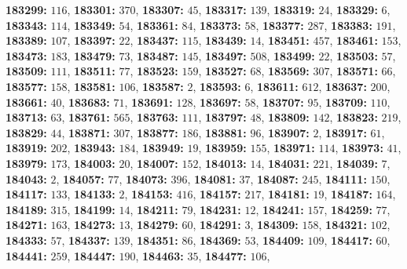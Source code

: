 \textsf{\bfseries 183299:} $116$, \textsf{\bfseries 183301:} $370$, \textsf{\bfseries 183307:} $45$, \textsf{\bfseries 183317:} $139$, \textsf{\bfseries 183319:} $24$, \textsf{\bfseries 183329:} $6$, \textsf{\bfseries 183343:} $114$, \textsf{\bfseries 183349:} $54$, \textsf{\bfseries 183361:} $84$, \textsf{\bfseries 183373:} $58$, \textsf{\bfseries 183377:} $287$, \textsf{\bfseries 183383:} $191$, \textsf{\bfseries 183389:} $107$, \textsf{\bfseries 183397:} $22$, \textsf{\bfseries 183437:} $115$, \textsf{\bfseries 183439:} $14$, \textsf{\bfseries 183451:} $457$, \textsf{\bfseries 183461:} $153$, \textsf{\bfseries 183473:} $183$, \textsf{\bfseries 183479:} $73$, \textsf{\bfseries 183487:} $145$, \textsf{\bfseries 183497:} $508$, \textsf{\bfseries 183499:} $22$, \textsf{\bfseries 183503:} $57$, \textsf{\bfseries 183509:} $111$, \textsf{\bfseries 183511:} $77$, \textsf{\bfseries 183523:} $159$, \textsf{\bfseries 183527:} $68$, \textsf{\bfseries 183569:} $307$, \textsf{\bfseries 183571:} $66$, \textsf{\bfseries 183577:} $158$, \textsf{\bfseries 183581:} $106$, \textsf{\bfseries 183587:} $2$, \textsf{\bfseries 183593:} $6$, \textsf{\bfseries 183611:} $612$, \textsf{\bfseries 183637:} $200$, \textsf{\bfseries 183661:} $40$, \textsf{\bfseries 183683:} $71$, \textsf{\bfseries 183691:} $128$, \textsf{\bfseries 183697:} $58$, \textsf{\bfseries 183707:} $95$, \textsf{\bfseries 183709:} $110$, \textsf{\bfseries 183713:} $63$, \textsf{\bfseries 183761:} $565$, \textsf{\bfseries 183763:} $111$, \textsf{\bfseries 183797:} $48$, \textsf{\bfseries 183809:} $142$, \textsf{\bfseries 183823:} $219$, \textsf{\bfseries 183829:} $44$, \textsf{\bfseries 183871:} $307$, \textsf{\bfseries 183877:} $186$, \textsf{\bfseries 183881:} $96$, \textsf{\bfseries 183907:} $2$, \textsf{\bfseries 183917:} $61$, \textsf{\bfseries 183919:} $202$, \textsf{\bfseries 183943:} $184$, \textsf{\bfseries 183949:} $19$, \textsf{\bfseries 183959:} $155$, \textsf{\bfseries 183971:} $114$, \textsf{\bfseries 183973:} $41$, \textsf{\bfseries 183979:} $173$, \textsf{\bfseries 184003:} $20$, \textsf{\bfseries 184007:} $152$, \textsf{\bfseries 184013:} $14$, \textsf{\bfseries 184031:} $221$, \textsf{\bfseries 184039:} $7$, \textsf{\bfseries 184043:} $2$, \textsf{\bfseries 184057:} $77$, \textsf{\bfseries 184073:} $396$, \textsf{\bfseries 184081:} $37$, \textsf{\bfseries 184087:} $245$, \textsf{\bfseries 184111:} $150$, \textsf{\bfseries 184117:} $133$, \textsf{\bfseries 184133:} $2$, \textsf{\bfseries 184153:} $416$, \textsf{\bfseries 184157:} $217$, \textsf{\bfseries 184181:} $19$, \textsf{\bfseries 184187:} $164$, \textsf{\bfseries 184189:} $315$, \textsf{\bfseries 184199:} $14$, \textsf{\bfseries 184211:} $79$, \textsf{\bfseries 184231:} $12$, \textsf{\bfseries 184241:} $157$, \textsf{\bfseries 184259:} $77$, \textsf{\bfseries 184271:} $163$, \textsf{\bfseries 184273:} $13$, \textsf{\bfseries 184279:} $60$, \textsf{\bfseries 184291:} $3$, \textsf{\bfseries 184309:} $158$, \textsf{\bfseries 184321:} $102$, \textsf{\bfseries 184333:} $57$, \textsf{\bfseries 184337:} $139$, \textsf{\bfseries 184351:} $86$, \textsf{\bfseries 184369:} $53$, \textsf{\bfseries 184409:} $109$, \textsf{\bfseries 184417:} $60$, \textsf{\bfseries 184441:} $259$, \textsf{\bfseries 184447:} $190$, \textsf{\bfseries 184463:} $35$, \textsf{\bfseries 184477:} $106$, 
